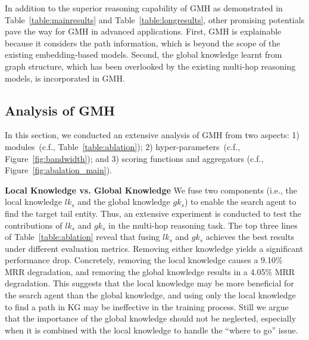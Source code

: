 In addition to the %
superior reasoning capability of GMH as demonstrated in Table~\ref{table:mainresults} and Table~\ref{table:longresults}, other promising potentials pave the way for GMH in advanced applications. %
First, GMH is explainable because it considers the path information, which is beyond the scope of the existing embedding-based models. %
Second, the global knowledge learnt from graph structure, which has been overlooked by the existing multi-hop reasoning models, is incorporated in GMH.








\subsection{Analysis of GMH}
\label{sec:ablation}

In this section, we conducted an extensive analysis of GMH from two aspects:
1) modules~(c.f., Table~\ref{table:ablation});
2) hyper-parameters~(c.f., Figure~\ref{fig:bandwidth});
and 3) scoring functions and aggregators (c.f., Figure~\ref{fig:abalation_main}).




\noindent
\textbf{Local Knowledge vs. Global Knowledge}
We fuse two components (i.e., the local knowledge $lk_{s}$ and the global knowledge $gk_{s}$) to enable the search agent to find the target tail entity. Thus, an extensive experiment is conducted to test the contributions of $lk_{s}$ and $gk_{s}$ in the multi-hop reasoning task.
The top three lines of Table~\ref{table:ablation} reveal that 
fusing $lk_{s}$ and $gk_{s}$ achieves the best results under different evaluation metrics. 
Removing %
either knowledge %
yields a significant performance drop. 
Concretely, removing the local knowledge causes a 9.10\% MRR degradation, %
and removing the global knowledge results in a 4.05\% MRR degradation.
This suggests that the local knowledge %
may be more beneficial for the search agent than the global knowledge, and using only the %
local knowledge to find a path in KG %
may be ineffective in the training process.
Still we argue that the importance of the global knowledge should not be neglected, especially when it is combined with the local knowledge to handle the ``where to go'' issue.

